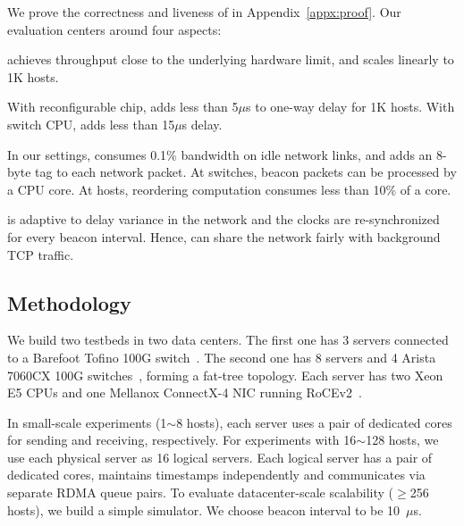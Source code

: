 We prove the correctness and liveness of \sys in Appendix~\ref{appx:proof}. Our evaluation centers around four aspects:

\sys achieves throughput close to the underlying hardware limit, and scales linearly to 1K hosts.

With reconfigurable chip, \sys adds less than 5$\mu$s to one-way delay for 1K hosts. With switch CPU, \sys adds less than 15$\mu$s delay.

In our settings, \sys consumes 0.1\% bandwidth on idle network links, and adds an 8-byte tag to each network packet. At switches, beacon packets can be processed by a CPU core. At hosts, reordering computation consumes less than 10\% of a core.

\sys is adaptive to delay variance in the network and the clocks are re-synchronized for every beacon interval. Hence, \sys can share the network fairly with background TCP traffic.

\subsection{Methodology}
\label{sec:testbed}

We build two testbeds in two data centers.
The first one has 3 servers connected to a Barefoot Tofino 100G switch~\cite{tofino}.
The second one has 8 servers and 4 Arista 7060CX 100G switches~\cite{arista}, forming a fat-tree topology.
Each server has two Xeon E5 CPUs and one Mellanox ConnectX-4 NIC running RoCEv2~\cite{infinibandrocev2}.


In small-scale experiments (1$\sim$8 hosts), each server uses a pair of dedicated cores for sending and receiving, respectively.
For experiments with 16$\sim$128 hosts, we use each physical server as 16 logical servers. Each logical server has a pair of dedicated cores, maintains timestamps independently and communicates via separate RDMA queue pairs.
To evaluate datacenter-scale scalability ($\ge$256 hosts), we build a simple simulator.
We choose beacon interval to be 10~$\mu$s.


